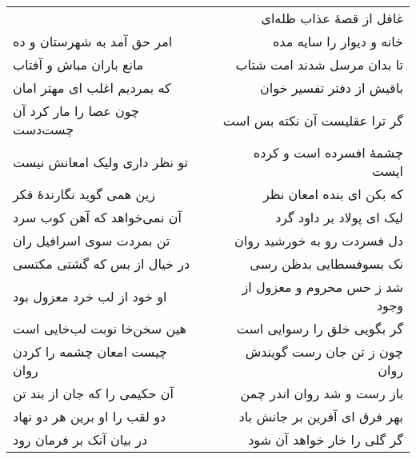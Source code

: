 \begin{center}
\begin{longtable}{l p{0.5cm} r}
&&
غافل از قصهٔ عذاب ظله‌ای
\\
امر حق آمد به شهرستان و ده
&&
خانه و دیوار را سایه مده
\\
مانع باران مباش و آفتاب
&&
تا بدان مرسل شدند امت شتاب
\\
که بمردیم اغلب ای مهتر امان
&&
باقیش از دفتر تفسیر خوان
\\
چون عصا را مار کرد آن چست‌دست
&&
گر ترا عقلیست آن نکته بس است
\\
تو نظر داری ولیک امعانش نیست
&&
چشمهٔ افسرده است و کرده ایست
\\
زین همی گوید نگارندهٔ فکر
&&
که بکن ای بنده امعان نظر
\\
آن نمی‌خواهد که آهن کوب سرد
&&
لیک ای پولاد بر داود گرد
\\
تن بمردت سوی اسرافیل ران
&&
دل فسردت رو به خورشید روان
\\
در خیال از بس که گشتی مکتسی
&&
نک بسوفسطایی بدظن رسی
\\
او خود از لب خرد معزول بود
&&
شد ز حس محروم و معزول از وجود
\\
هین سخن‌خا نوبت لب‌خایی است
&&
گر بگویی خلق را رسوایی است
\\
چیست امعان چشمه را کردن روان
&&
چون ز تن جان رست گویندش روان
\\
آن حکیمی را که جان از بند تن
&&
باز رست و شد روان اندر چمن
\\
دو لقب را او برین هر دو نهاد
&&
بهر فرق ای آفرین بر جانش باد
\\
در بیان آنک بر فرمان رود
&&
گر گلی را خار خواهد آن شود
\\
\end{longtable}
\end{center}

